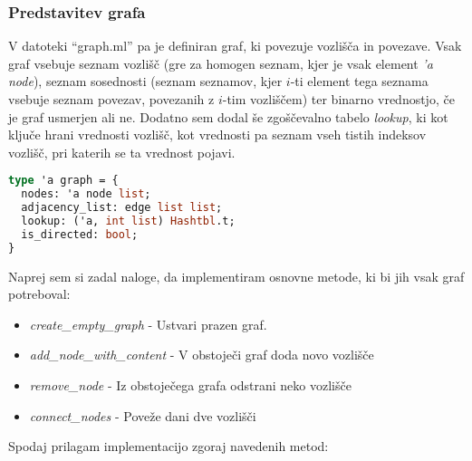 \documentclass[mat1, tisk]{fmfdelo}
\begin{document}
\subsubsection{Predstavitev grafa}

V datoteki ``graph.ml'' pa je definiran graf, ki povezuje vozlišča in povezave. Vsak graf vsebuje seznam vozlišč (gre za homogen seznam, kjer je vsak element \textit{'a node}), 
seznam sosednosti (seznam seznamov, kjer $i$-ti element tega seznama vsebuje seznam povezav, povezanih z $i$-tim vozliščem) ter binarno vrednostjo, če je graf usmerjen ali ne. 
Dodatno sem dodal še zgoščevalno tabelo \textit{lookup}, ki kot ključe hrani vrednosti vozlišč, kot vrednosti pa seznam vseh tistih indeksov vozlišč, pri katerih se ta vrednost pojavi.

\begin{lstlisting}[language=Caml, caption={Definicija grafa v OCamlu}, label={lst:graph_ocaml_type}]
type 'a graph = {
  nodes: 'a node list;
  adjacency_list: edge list list;
  lookup: ('a, int list) Hashtbl.t;
  is_directed: bool;
}
\end{lstlisting}

Naprej sem si zadal naloge, da implementiram osnovne metode, ki bi jih vsak graf potreboval: 
\begin{itemize}
  \item \textit{create\_empty\_graph} - Ustvari prazen graf.
  \item \textit{add\_node\_with\_content} - V obstoječi graf doda novo vozlišče
  \item \textit{remove\_node} - Iz obstoječega grafa odstrani neko vozlišče
  \item \textit{connect\_nodes} - Poveže dani dve vozlišči
\end{itemize}

Spodaj prilagam implementacijo zgoraj navedenih metod:
\end{document}
